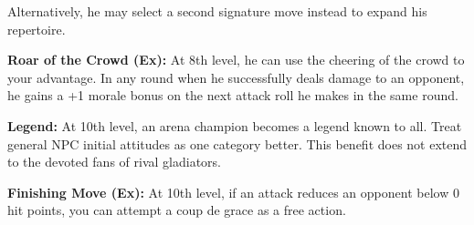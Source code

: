 {Alternatively, he may select a second signature move instead to expand his repertoire.

\textbf{Roar of the Crowd (Ex):} At 8th level, he can use the cheering of the crowd to your advantage. In any round when he successfully deals damage to an opponent, he gains a +1 morale bonus on the next attack roll he makes in the same round.

\textbf{Legend:} At 10th level, an arena champion becomes a legend known to all. Treat general NPC initial attitudes as one category better. This benefit does not extend to the devoted fans of rival gladiators.

\textbf{Finishing Move (Ex):} At 10th level, if an attack reduces an opponent below 0 hit points, you can attempt a coup de grace as a free action.
}

